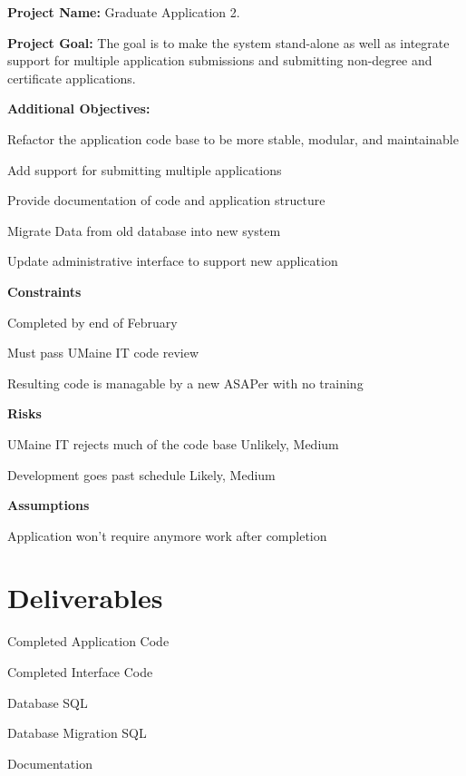 {\bfseries Project Name\-:} Graduate Application 2.

{\bfseries Project Goal\-:} The goal is to make the system stand-\/alone as well as integrate support for multiple application submissions and submitting non-\/degree and certificate applications.

{\bfseries Additional Objectives\-:}


\begin{DoxyItemize}
\item Refactor the application code base to be more stable, modular, and maintainable
\item Add support for submitting multiple applications
\item Provide documentation of code and application structure
\item Migrate Data from old database into new system
\item Update administrative interface to support new application
\end{DoxyItemize}

{\bfseries Constraints}


\begin{DoxyItemize}
\item Completed by end of February
\item Must pass U\-Maine I\-T code review
\item Resulting code is managable by a new A\-S\-A\-Per with no training
\end{DoxyItemize}

{\bfseries Risks}


\begin{DoxyItemize}
\item U\-Maine I\-T rejects much of the code base Unlikely, Medium
\item Development goes past schedule Likely, Medium
\end{DoxyItemize}

{\bfseries Assumptions}


\begin{DoxyItemize}
\item Application won't require anymore work after completion
\end{DoxyItemize}

\section*{Deliverables}


\begin{DoxyItemize}
\item Completed Application Code
\item Completed Interface Code
\item Database S\-Q\-L
\item Database Migration S\-Q\-L
\item Documentation
\end{DoxyItemize}

